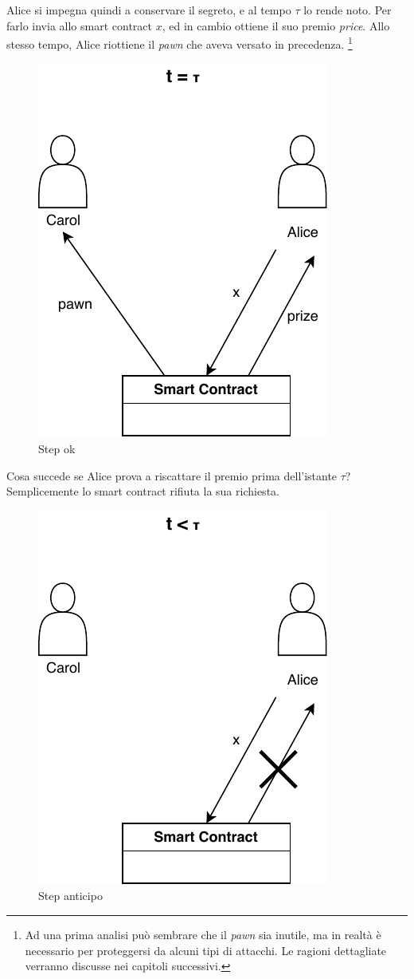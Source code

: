Alice si impegna quindi a conservare il segreto, e al tempo $ \tau $ lo rende noto.
Per farlo invia allo smart contract $ x $, ed in cambio ottiene il suo premio
\textit{price}.
Allo stesso tempo, Alice riottiene il \textit{pawn} che aveva versato in precedenza.
\footnote{Ad una prima analisi può sembrare che il \textit{pawn} sia inutile, 
ma in realtà è necessario per proteggersi da alcuni tipi di attacchi.
Le ragioni dettagliate verranno discusse nei capitoli successivi.}
\begin{figure}[H]
	\centering
	\includegraphics[width=0.3\linewidth]{images/chap_protocollo/step-ok.pdf}
	\caption{Step ok}
\end{figure}

Cosa succede se Alice prova a riscattare il premio prima dell'istante $ \tau $?
Semplicemente lo smart contract rifiuta la sua richiesta.
\begin{figure}[H]
	\centering
	\includegraphics[width=0.3\linewidth]{images/chap_protocollo/step-anticipo.pdf}
	\caption{Step anticipo}
\end{figure}

